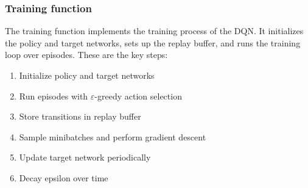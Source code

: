 \documentclass[a4paper,12pt]{article}
\begin{document}
\subsubsection{Training function}
The training function implements the training process of the DQN. It initializes the policy and target networks, sets up the replay buffer, and runs the training loop over episodes. These are the key steps:
\begin{enumerate}
    \item Initialize policy and target networks
    \item Run episodes with $\varepsilon$-greedy action selection
    \item Store transitions in replay buffer
    \item Sample minibatches and perform gradient descent
    \item Update target network periodically
    \item Decay epsilon over time
\end{enumerate}
\end{document}
